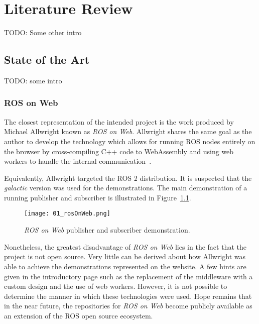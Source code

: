 \chapter{Literature Review}\label{cha:literature}

    TODO: Some other intro

\section{State of the Art}

    TODO: some intro

    \subsection{ROS on Web}

        The closest representation of the intended project is the work produced by Michael Allwright known as \textit{ROS on Web}. Allwright shares the same goal as the author to develop the technology which allows for running ROS nodes entirely on the browser by cross-compiling C++ code to WebAssembly and using web workers to handle the internal communication~\cite{rosonweb}.

        Equivalently, Allwright targeted the \ac{ROS} 2 distribution. It is suspected that the \textit{galactic} version was used for the demonstrations. The main demonstration of a running publisher and subscriber is illustrated in Figure~\ref{fig:rosonweb}.
        
        
        \begin{figure}[htbp]
            \centering
            \texttt{[image: 01\_rosOnWeb.png]}
            \caption{\textit{ROS on Web} publisher and subscriber demonstration.}
            \label{fig:rosonweb}
        \end{figure}

        Nonetheless, the greatest disadvantage of \textit{ROS on Web} lies in the fact that the project is not open source. Very little can be derived about how Allwright was able to achieve the demonstrations represented on the website. A few hints are given in the introductory page such as the replacement of the middleware with a custom design and the use of web workers. However, it is not possible to determine the manner in which these technologies were used. Hope remains that in the near future, the repositories for \textit{ROS on Web} become publicly available as an extension of the ROS open source ecosystem.

